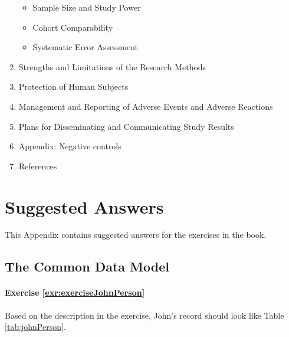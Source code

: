 \documentclass[11pt]{book}
\providecommand{\tightlist}{%
  \setlength{\itemsep}{0pt}\setlength{\parskip}{0pt}}
\theoremstyle{definition}
\theoremstyle{definition}
\theoremstyle{definition}
\theoremstyle{remark}
\begin{document}
\begin{enumerate}
  \begin{itemize}
  \tightlist
  \item
    Sample Size and Study Power\\
  \item
    Cohort Comparability\\
  \item
    Systematic Error Assessment\\
  \end{itemize}
\item
  Strengths and Limitations of the Research Methods\\
\item
  Protection of Human Subjects\\
\item
  Management and Reporting of Adverse Events and Adverse Reactions\\
\item
  Plans for Disseminating and Communicating Study Results
\item
  Appendix: Negative controls
\item
  References
\end{enumerate}

\chapter{Suggested Answers}\label{SuggestedAnswers}

This Appendix contains suggested answers for the exercises in the book.

\section{The Common Data Model}\label{Cdmanswers}

\subsubsection*{Exercise
\ref{exr:exerciseJohnPerson}}\label{exercise-refexrexercisejohnperson}

Based on the description in the exercise, John's record should look like
Table \ref{tab:johnPerson}.
\end{document}
